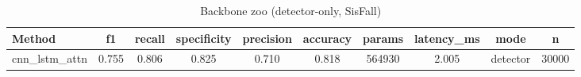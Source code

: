 \begin{table}[t]
\centering
\caption{Backbone zoo (detector-only, SisFall)}
\begin{tabular}{lccccccccc}
\toprule
Method & f1 & recall & specificity & precision & accuracy & params & latency_ms & mode & n \\
\midrule
cnn_lstm_attn & 0.755 & 0.806 & 0.825 & 0.710 & 0.818 & 564930 & 2.005 & detector & 30000 \\
\bottomrule
\end{tabular}
\end{table}